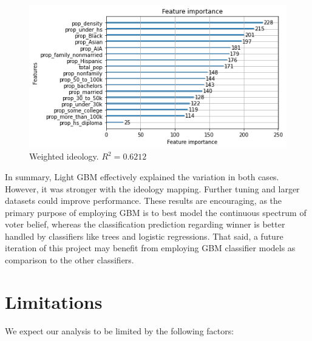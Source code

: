 \documentclass{article}
\begin{document}
\begin{figure}
  \centering

  \includegraphics[width=\textwidth]{weight_feat_imp}
  \caption{Weighted ideology. $R^2=0.6212$}
\end{figure}

In summary, Light GBM effectively explained the variation in both cases. However, it was
stronger with the ideology mapping. Further tuning and larger datasets could improve performance. 
These results are encouraging, as the primary purpose of employing GBM is to best model the
continuous spectrum of voter belief, whereas the classification prediction regarding winner
is better handled by classifiers like trees and logistic regressions. That said, a future
iteration of this project may benefit from employing GBM classifier models as comparison to
the other classifiers.

\newpage
\section{Limitations}

We expect our analysis to be limited by the following factors:
\end{document}
